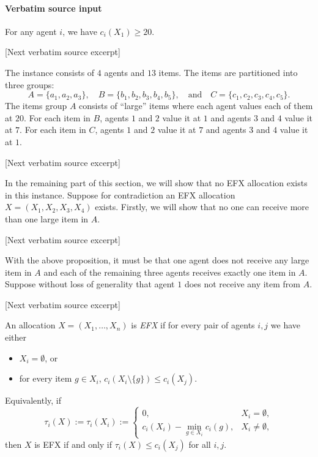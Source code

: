 \documentclass[10pt]{article}
\begin{document}
\paragraph{Verbatim source input}
\begin{ReviewVerbatim}
\begin{proposition}
    For any agent $i$, we have $c_i(X_1)\geq 20$.
\end{proposition}

[Next verbatim source excerpt]

The instance consists of $4$ agents and $13$ items.
The items are partitioned into three groups:
$$A=\{a_1,a_2,a_3\},\quad B=\{b_1,b_2,b_3,b_4,b_5\},\quad\mbox{and}\quad C=\{c_1,c_2,c_3,c_4,c_5\}.$$
The items group $A$ consists of ``large'' items where each agent values each of them at $20$.
For each item in $B$, agents $1$ and $2$ value it at $1$ and agents $3$ and $4$ value it at $7$.
For each item in $C$, agents $1$ and $2$ value it at $7$ and agents $3$ and $4$ value it at $1$.

[Next verbatim source excerpt]

In the remaining part of this section, we will show that no EFX allocation exists in this instance.
Suppose for contradiction an EFX allocation $X=(X_1,X_2,X_3,X_4)$ exists.
Firstly, we will show that no one can receive more than one large item in $A$.

[Next verbatim source excerpt]

With the above proposition, it must be that one agent does not receive any large item in $A$ and each of the remaining three agents receives exactly one item in $A$.
Suppose without loss of generality that agent $1$ does not receive any item from $A$.

[Next verbatim source excerpt]

\begin{definition}
An allocation $X=(X_1,\ldots,X_n)$ is \emph{EFX} if for every pair of agents $i,j$ we have either
\begin{itemize}
    \item $X_i=\emptyset$, or
    \item for every item $g\in X_i$, $c_i(X_i\setminus\{g\})\le c_i(X_j).$
\end{itemize}
Equivalently, if
\[
    \tau_i(X):=\tau_i(X_i):=
    \begin{cases}
        0, & X_i=\emptyset,\\
        c_i(X_i)-\min_{g\in X_i}c_i(g), & X_i\ne\emptyset,
    \end{cases}
\]
then $X$ is EFX if and only if $\tau_i(X)\le c_i(X_j)$ for all $i,j$.
\end{definition}
\end{ReviewVerbatim}
\end{document}
